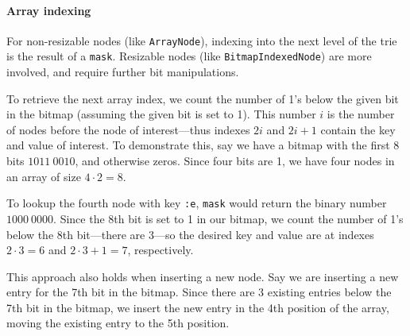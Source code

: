 \documentclass[preprint]{sigplanconf}
\begin{document}
\paragraph{Array indexing}

For non-resizable nodes (like \texttt{ArrayNode}),
indexing into the next level of the trie
is the result of a \texttt{mask}.
Resizable nodes (like \texttt{BitmapIndexedNode})
are more involved,
and require further bit manipulations.

To retrieve the next array index, we count the number of 1's
below the given bit in the bitmap (assuming the given
bit is set to 1).
This number $i$ is the number of nodes before
the node of interest---thus indexes $2i$ and $2i+1$
contain the key and value of interest.
To demonstrate this, say we have a bitmap
with the first 8 bits $1011\ 0010$, and
otherwise zeros.
Since four bits are 1, we have four nodes
in an array of size $4\cdot2=8$.



To lookup the fourth node with key \texttt{:e},
\texttt{mask} would return the binary number
$1000\ 0000$.
Since the 8th bit is set to 1 in our bitmap,
we count the number of 1's below the 
8th bit---there are 3---so the desired key and value are at
indexes
$2\cdot3=6$
and
$2\cdot3+1=7$,
respectively.

This approach also holds when inserting a new node.
Say we are inserting a new entry
for the 7th bit in the bitmap.
Since there are 3 existing entries below
the 7th bit in the bitmap, we insert
the new entry in
the 4th position of the array, moving the 
existing entry to the 5th position.
\end{document}
